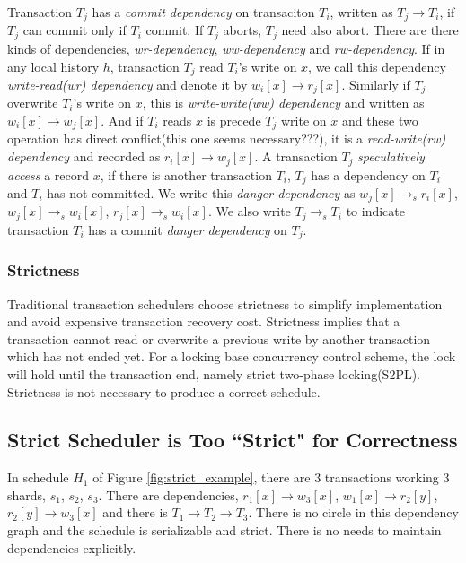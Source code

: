 \documentclass[conference]{IEEEtran}
\begin{document}
Transaction ${T_j}$ has a \emph{commit dependency} on transaciton ${T_i}$, written as ${T_j \rightarrow T_i}$, if ${T_j}$ can commit only if ${T_i}$ commit. 
If ${T_j}$ aborts, ${T_j}$ need also abort.
There are there kinds of dependencies, \emph{wr-dependency}, \emph{ww-dependency} and \emph{rw-dependency}.
If in any local history ${h}$, transaction ${T_j}$ read ${T_i}$'s write on ${x}$,
we call this dependency \emph{write-read(wr) dependency} and denote it by ${w_i[x] \rightarrow r_j[x]}$.
Similarly if ${T_j}$ overwrite ${T_i}$'s write on ${x}$, this is \emph{write-write(ww) dependency} and written as ${w_i[x] \rightarrow w_j[x]}$.
And if ${T_i}$ reads ${x}$ is precede ${T_j}$ write on ${x}$ and these two operation has direct conflict(this one seems necessary???), it is a \emph{read-write(rw) dependency} and recorded as ${r_i[x] \rightarrow w_j[x]}$. 
A transaction ${T_j}$ \emph{speculatively access} a record ${x}$, if there is another transaction ${T_i}$, 
${T_j}$ has a dependency on ${T_i}$ and  ${T_i}$ has not committed.
We write this \emph{danger dependency} as ${w_j[x] \rightarrow_s r_i[x]}$, ${w_j[x] \rightarrow_s w_i[x]}$, 
${r_j[x] \rightarrow_s w_i[x]}$.
We also write ${T_j \rightarrow_s T_i}$ to indicate transaction ${T_i}$ has a commit \emph{danger dependency} on ${T_j}$. 

\subsubsection{Strictness}

Traditional transaction schedulers choose strictness\cite{DBLP:conf/vldb/Raz92} to simplify implementation and avoid expensive transaction recovery cost.
Strictness implies that a transaction cannot read or overwrite a previous write by another transaction which has not ended yet.
For a locking base concurrency control scheme, the lock will hold until the transaction end, namely strict two-phase locking(S2PL).
Strictness is not necessary to produce a correct schedule.


\subsection{Strict Scheduler is Too ``Strict" for Correctness}

In schedule ${H_1}$ of Figure \ref{fig:strict_example}, there are 3 transactions working 3 shards, ${s_1}$, ${s_2}$, ${s_3}$.
There are dependencies, ${r_1[x] \rightarrow w_3[x]}$, ${w_1[x] \rightarrow r_2[y]}$, ${r_2[y] \rightarrow w_3[x]}$ and there is ${T_1 \rightarrow T_2 \rightarrow T_3}$.
There is no circle in this dependency graph and the schedule is serializable and strict. 
There is no needs to maintain dependencies explicitly.
\end{document}
